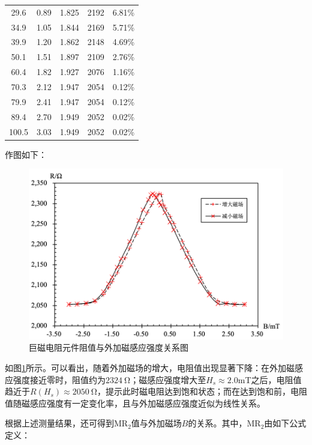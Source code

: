 \documentclass{thuemp}
\begin{document}
\begin{table}[H]
\begin{tabular}{ccccc}
        29.6  & 0.89  & 1.825 & 2192 &  6.81\%  \\
        34.9  & 1.05  & 1.844 & 2169 &  5.71\%  \\
        39.9  & 1.20  & 1.862 & 2148 &  4.69\%  \\
        50.1  & 1.51  & 1.897 & 2109 &  2.76\%  \\
        60.4  & 1.82  & 1.927 & 2076 &  1.16\%  \\
        70.3  & 2.12  & 1.947 & 2054 &  0.12\%  \\
        79.9  & 2.41  & 1.947 & 2054 &  0.12\%  \\
        89.4  & 2.70  & 1.949 & 2052 &  0.02\%  \\
        100.5 & 3.03  & 1.949 & 2052 &  0.02\%  \\
        \bottomrule
    \end{tabular}
\end{table}

作图如下：

\begin{figure}[H]
    \centering
    \includegraphics[width=1.0\linewidth]{../Data/GMR-Plot-01-01-excel.png}
    \caption{巨磁电阻元件阻值与外加磁感应强度关系图} \label{fig:magnetoresistance}
\end{figure}

如图\ref{fig:magnetoresistance}所示。可以看出，随着外加磁场的增大，电阻值出现显著下降：在外加磁感应强度接近零时，阻值约为$2324~$\si{\ohm}；磁感应强度增大至$H_s \approx 2.0$\si{\milli\tesla}之后，电阻值趋近于$R(H_s)\approx 2050~$\si{\ohm}，提示此时磁电阻达到饱和状态；而在达到饱和前，电阻值随磁感应强度有一定变化率，且与外加磁感应强度近似为线性关系。

根据上述测量结果，还可得到$\mathrm{MR_2}$值与外加磁场$B$的关系。其中，$\mathrm{MR_2}$由如下公式定义：
\end{document}
